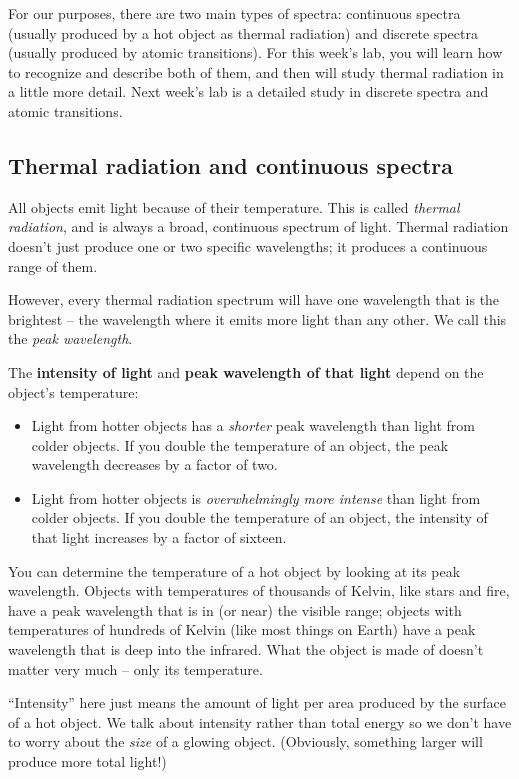 \documentclass[11pt]{article}
\begin{document}
For our purposes, there are two main types of spectra: continuous spectra (usually produced by a hot object as thermal radiation) and discrete spectra (usually produced by atomic transitions). For this week's lab, you will learn how to recognize and describe both of them, and then will study thermal radiation in a little more detail. Next week's lab is a detailed study in discrete spectra and atomic transitions.

\subsection{Thermal radiation and continuous spectra}

All objects emit light because of their temperature. This is called {\it thermal radiation}, and is always a broad, continuous spectrum of light. Thermal radiation doesn't just produce one or two specific wavelengths; it produces a continuous range of them. 

However, every thermal radiation spectrum will have one wavelength that is the brightest -- the wavelength where it emits more light than any other. We call this the {\it peak wavelength}.

The {\bf intensity of light} and {\bf peak wavelength of that light} depend on the object's temperature:

\begin{itemize}
\item Light from hotter objects has a {\it shorter} peak wavelength than light from colder objects. If you double the temperature of an object, the peak wavelength decreases by a factor of two.

\item Light from hotter objects is {\it overwhelmingly more intense} than light from colder objects. If you double the temperature of an object, the intensity of that light increases by a factor of sixteen.
\end{itemize}

You can determine the temperature of a hot object by looking at its peak wavelength. Objects with temperatures of thousands of Kelvin, like stars and fire, have a peak wavelength that is in (or near) the visible range; objects with temperatures of hundreds of Kelvin (like most things on Earth) have a peak wavelength that is deep into the infrared. What the object is made of doesn't matter very much -- only its temperature.

``Intensity'' here just means the amount of light per area produced by the surface of a hot object. We talk about intensity rather than total energy so we don't have to worry about the {\it size} of a glowing object. (Obviously, something larger will produce more total light!)
\end{document}
